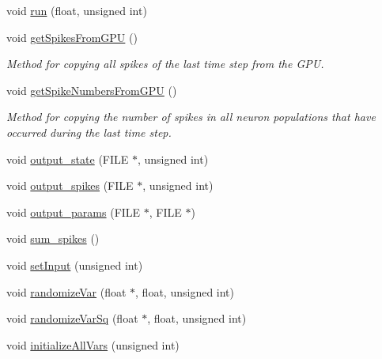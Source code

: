 \begin{DoxyCompactItemize}
void \hyperlink{classclassIzh_af26eb171e7856ede69d597e17b6bf445}{run} (float, unsigned int)
\item 
void \hyperlink{classclassIzh_ad555c603963d93621851a3eaa0dbf8e5}{get\+Spikes\+From\+G\+P\+U} ()
\begin{DoxyCompactList}\small\item\em Method for copying all spikes of the last time step from the G\+P\+U. \end{DoxyCompactList}\item 
void \hyperlink{classclassIzh_a45922a013797bb3fc93c8d3c51c619e3}{get\+Spike\+Numbers\+From\+G\+P\+U} ()
\begin{DoxyCompactList}\small\item\em Method for copying the number of spikes in all neuron populations that have occurred during the last time step. \end{DoxyCompactList}\item 
void \hyperlink{classclassIzh_a5a52b32cb0d24d7b5eaa7af6b930574f}{output\+\_\+state} (F\+I\+L\+E $\ast$, unsigned int)
\item 
void \hyperlink{classclassIzh_a84d0f9ea387dbc8626595f37aa14f01b}{output\+\_\+spikes} (F\+I\+L\+E $\ast$, unsigned int)
\item 
void \hyperlink{classclassIzh_a266d6ea6aa52227f4af47c0a7858f556}{output\+\_\+params} (F\+I\+L\+E $\ast$, F\+I\+L\+E $\ast$)
\item 
void \hyperlink{classclassIzh_a721c5922909192b3fd23d2907202b5ea}{sum\+\_\+spikes} ()
\item 
void \hyperlink{classclassIzh_a75c6b6ea09132daa34d06396dcc7f321}{set\+Input} (unsigned int)
\item 
void \hyperlink{classclassIzh_a613b77cd2615916130b2971656eb26d0}{randomize\+Var} (float $\ast$, float, unsigned int)
\item 
void \hyperlink{classclassIzh_a8e16c0e84a720b2a9cc6072ecc9efb61}{randomize\+Var\+Sq} (float $\ast$, float, unsigned int)
\item 
void \hyperlink{classclassIzh_a52fe8debc76c04e677ede74b5eb17896}{initialize\+All\+Vars} (unsigned int)
\end{DoxyCompactItemize}
